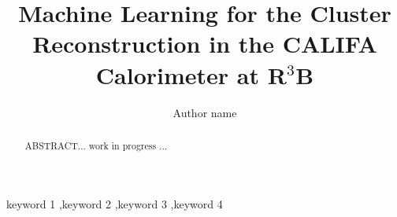 \documentclass[final,5p,times,twocolumn]{elsarticle}
\begin{document}
\begin{frontmatter}



\title{Machine Learning for the Cluster Reconstruction in the CALIFA Calorimeter at R$^3$B}


\author[first]{Author name}
\address[first]{organization={University of the Moon},%
            addressline={}, 
            city={Earth},
            postcode={}, 
            state={},
            country={}}

\begin{abstract}
ABSTRACT... work in progress ...
\end{abstract}



\begin{keyword}
keyword 1 \sep keyword 2 \sep keyword 3 \sep keyword 4



\end{keyword}


\end{frontmatter}
\end{document}
